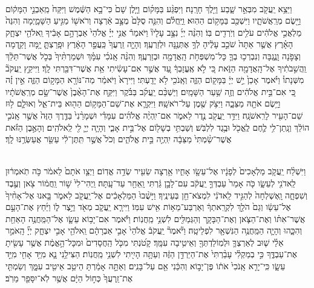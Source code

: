 \documentclass[twoside, openany, parskip=half, 11pt]{book}
\begin{document}
\begin{footnotesize}
\begin{multicols}{2}
\\
 וַיֵּצֵ֥א יַֽעֲקֹ֖ב מִבְּאֵ֣ר שָׁ֑בַע וַיֵּ֖לֶךְ חָרָֽנָה׃ וַיִּפְגַּ֨ע בַּמָּק֜וֹם וַיָּ֤לֶן שָׁם֙ כִּי־בָ֣א הַשֶּׁ֔מֶשׁ וַיִּקַּח֙ מֵֽאַבְנֵ֣י הַמָּק֔וֹם וַיָּ֖שֶׂם מְרַֽאֲשֹׁתָ֑יו וַיִּשְׁכַּ֖ב בַּמָּק֥וֹם הַהֽוּא׃ וַֽיַּֽחֲלֹ֗ם וְהִנֵּ֤ה סֻלָּם֙ מֻצָּ֣ב אַ֔רְצָה וְרֹאשׁ֖וֹ מַגִּ֣יעַ הַשָּׁמָ֑יְמָה וְהִנֵּה֙ מַלְאֲכֵ֣י אֱלֹהִ֔ים עֹלִ֥ים וְיֹֽרְדִ֖ים בּֽוֹ׃  וְהִנֵּ֨ה יְיָ֜ נִצָּ֣ב עָלָיו֘ וַיֹּאמַר֒ אֲנִ֣י יְיָ֗ אֱלֹהֵי֙ אַבְרָהָ֣ם אָבִ֔יךָ וֵֽאלֹהֵ֖י יִצְחָ֑ק הָאָ֗רֶץ אֲשֶׁ֤ר אַתָּה֙ שֹׁכֵ֣ב עָלֶ֔יהָ לְךָ֥ אֶתְּנֶ֖נָּה וּלְזַרְעֶֽךָ׃ וְהָיָ֤ה זַֽרְעֲךָ֙ כַּֽעֲפַ֣ר הָאָ֔רֶץ וּפָֽרַצְתָּ֛ יָ֥מָּה וָקֵ֖דְמָה וְצָפֹ֣נָה וָנֶ֑גְבָּה וְנִבְרְכ֥וּ בְךָ֛ כָּל־מִשְׁפְּחֹ֥ת הָֽאֲדָמָ֖ה וּבְזַרְעֶֽךָ׃ וְהִנֵּ֨ה אָֽנֹכִ֜י עִמָּ֗ךְ וּשְׁמַרְתִּ֨יךָ֙ בְּכֹ֣ל אֲשֶׁר־תֵּלֵ֔ךְ וַֽהֲשִׁ֣בֹתִ֔יךָ אֶל־הָֽאֲדָמָ֖ה הַזֹּ֑את כִּ֚י לֹ֣א אֶֽעֱזָבְךָ֔ עַ֚ד אֲשֶׁ֣ר אִם־עָשִׂ֔יתִי אֵ֥ת אֲשֶׁר־דִּבַּ֖רְתִּי לָֽךְ׃ וַיִּיקַ֣ץ יַֽעֲקֹב֘ מִשְּׁנָתוֹ֒ וַיֹּ֗אמֶר אָכֵן֙ יֵ֣שׁ יְיָ֔ בַּמָּק֖וֹם הַזֶּ֑ה וְאָֽנֹכִ֖י לֹ֥א יָדָֽעְתִּי׃ וַיִּירָא֙ וַיֹּאמַ֔ר מַה־נּוֹרָ֖א הַמָּק֣וֹם הַזֶּ֑ה אֵ֣ין זֶ֗ה כִּ֚י אִם־בֵּ֣ית אֱלֹהִ֔ים וְזֶ֖ה שַׁ֥עַר הַשָּׁמָֽיִם׃  וַיַּשְׁכֵּ֨ם יַֽעֲקֹ֜ב בַּבֹּ֗קֶר וַיִּקַּ֤ח אֶת־הָאֶ֨בֶן֙ אֲשֶׁר־שָׂ֣ם מְרַֽאֲשֹׁתָ֔יו וַיָּ֥שֶׂם אֹתָ֖הּ מַצֵּבָ֑ה וַיִּצֹ֥ק שֶׁ֖מֶן עַל־רֹאשָֽׁהּ׃ וַיִּקְרָ֛א אֶת־שֵׁם־הַמָּק֥וֹם הַה֖וּא בֵּית־אֵ֑ל וְאוּלָ֛ם ל֥וּז שֵׁם־הָעִ֖יר לָרִֽאשֹׁנָֽה׃ וַיִּדַּ֥ר יַֽעֲקֹ֖ב נֶ֣דֶר לֵאמֹ֑ר אִם־יִֽהְיֶ֨ה אֱלֹהִ֜ים עִמָּדִ֗י וּשְׁמָרַ֨נִי֙ בַּדֶּ֤רֶךְ הַזֶּה֙ אֲשֶׁ֣ר אָֽנֹכִ֣י הוֹלֵ֔ךְ וְנָֽתַן־לִ֥י לֶ֛חֶם לֶֽאֱכֹ֖ל וּבֶ֥גֶד לִלְבֹּֽשׁ׃ וְשַׁבְתִּ֥י בְשָׁל֖וֹם אֶל־בֵּ֣ית אָבִ֑י וְהָיָ֧ה יְיָ֛ לִ֖י לֵֽאלֹהִֽים׃ וְהָאֶ֣בֶן הַזֹּ֗את אֲשֶׁר־שַׂ֨מְתִּי֙ מַצֵּבָ֔ה יִֽהְיֶ֖ה בֵּ֣ית אֱלֹהִ֑ים וְכֹל֙ אֲשֶׁ֣ר תִּֽתֶּן־לִ֔י עַשֵּׂ֖ר אֲעַשְּׂרֶ֥נּוּ לָֽךְ׃

\\
 וַיִּשְׁלַ֨ח יַֽעֲקֹ֤ב מַלְאָכִים֙ לְפָנָ֔יו אֶל־עֵשָׂ֖ו אָחִ֑יו אַ֥רְצָה שֵׂעִ֖יר שְׂדֵ֥ה אֱדֽוֹם׃ וַיְצַ֤ו אֹתָם֙ לֵאמֹ֔ר כֹּ֣ה תֹֽאמְר֔וּן לַֽאדֹנִ֖י לְעֵשָׂ֑ו כֹּ֤ה אָמַר֙ עַבְדְּךָ֣ יַֽעֲקֹ֔ב עִם־לָבָ֣ן גַּ֔רְתִּי וָֽאֵחַ֖ר עַד־עָֽתָּה׃ וַֽיְהִי־לִי֙ שׁ֣וֹר וַֽחֲמ֔וֹר צֹ֖אן וְעֶ֣בֶד וְשִׁפְחָ֑ה וָֽאֶשְׁלְחָה֙ לְהַגִּ֣יד לַֽאדֹנִ֔י לִמְצֹא־חֵ֖ן בְּעֵינֶֽיךָ׃  וַיָּשֻׁ֨בוּ֙ הַמַּלְאָכִ֔ים אֶל־יַֽעֲקֹ֖ב לֵאמֹ֑ר בָּ֤אנוּ אֶל־אָחִ֨יךָ֙ אֶל־עֵשָׂ֔ו וְגַם֙ הֹלֵ֣ךְ לִקְרָֽאתְךָ֔ וְאַרְבַּע־מֵא֥וֹת אִ֖ישׁ עִמּֽוֹ׃ וַיִּירָ֧א יַֽעֲקֹ֛ב מְאֹ֖ד וַיֵּ֣צֶר ל֑וֹ וַיַּ֜חַץ אֶת־הָעָ֣ם אֲשֶׁר־אִתּ֗וֹ וְאֶת־הַצֹּ֧אן וְאֶת־הַבָּקָ֛ר וְהַגְּמַלִּ֖ים לִשְׁנֵ֥י מַֽחֲנֽוֹת׃ וַיֹּ֕אמֶר אִם־יָב֥וֹא עֵשָׂ֛ו אֶל־הַמַּֽחֲנֶ֥ה הָאַחַ֖ת וְהִכָּ֑הוּ וְהָיָ֛ה הַמַּֽחֲנֶ֥ה הַנִּשְׁאָ֖ר לִפְלֵיטָֽה׃  וַיֹּ֘אמֶר֘ יַֽעֲקֹב֒ אֱלֹהֵי֙ אָבִ֣י אַבְרָהָ֔ם וֵֽאלֹהֵ֖י אָבִ֣י יִצְחָ֑ק יְיָ֞ הָֽאֹמֵ֣ר אֵלַ֗י שׁ֧וּב לְאַרְצְךָ֛ וּלְמֽוֹלַדְתְּךָ֖ וְאֵיטִ֥יבָה עִמָּֽךְ׃ קָטֹ֝נְתִּי מִכֹּ֤ל הַֽחֲסָדִים֙ וּמִכָּל־הָ֣אֱמֶ֔ת אֲשֶׁ֥ר עָשִׂ֖יתָ אֶת־עַבְדֶּ֑ךָ כִּ֣י בְמַקְלִ֗י עָבַ֨רְתִּי֙ אֶת־הַיַּרְדֵּ֣ן הַזֶּ֔ה וְעַתָּ֥ה הָיִ֖יתִי לִשְׁנֵ֥י מַֽחֲנֽוֹת׃ הַצִּילֵ֥נִי נָ֛א מִיַּ֥ד אָחִ֖י מִיַּ֣ד עֵשָׂ֑ו כִּֽי־יָרֵ֤א אָֽנֹכִי֙ אֹת֔וֹ פֶּן־יָב֣וֹא וְהִכַּ֔נִי אֵ֖ם עַל־בָּנִֽים׃ וְאַתָּ֣ה אָמַ֔רְתָּ הֵיטֵ֥ב אֵיטִ֖יב עִמָּ֑ךְ וְשַׂמְתִּ֤י אֶת־זַֽרְעֲךָ֙ כְּח֣וֹל הַיָּ֔ם אֲשֶׁ֥ר לֹֽא־יִסָּפֵ֖ר מֵרֹֽב׃



\end{multicols}
\end{footnotesize}
\end{document}
